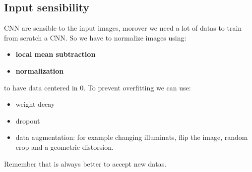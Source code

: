\subsection{Input sensibility}
CNN are sensible to the input images, morover we need a lot of datas to train from 
scratch a CNN. So we have to normalize images using:
\begin{itemize}
    \item \textbf{local mean subtraction}
    \item \textbf{normalization}
\end{itemize}
to have data centered in 0. To prevent overfitting we can use:
\begin{itemize}
    \item weight decay
    \item dropout
    \item data augmentation: for example changing illuminats, flip the image, random 
    crop and a geometric distorsion.
\end{itemize}

Remember that is always better to accept new datas.



